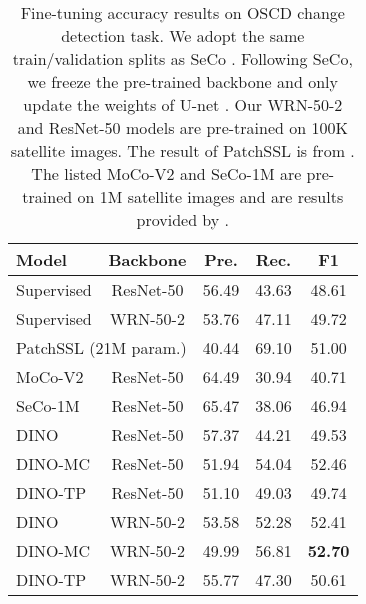 \documentclass[10pt,twocolumn,letterpaper]{article}
\begin{document}
\begin{table}
  \centering
  \begin{tabular}{lcccc}
    \toprule
    Model & Backbone & Pre. & Rec. & F1 \\
    \midrule
    Supervised & ResNet-50 & 56.49 & 43.63 & 48.61 \\
    Supervised & WRN-50-2 & 53.76 & 47.11 & 49.72 \\
    \multicolumn{2}{l}{PatchSSL (21M param.)} & 40.44 & 69.10 & 51.00 \\
MoCo-V2 & ResNet-50 & 64.49 & 30.94 & 40.71 \\
    SeCo-1M & ResNet-50 & 65.47 & 38.06 & 46.94 \\
    \midrule
    DINO & ResNet-50 & 57.37 & 44.21 & 49.53 \\
    DINO-MC & ResNet-50 & 51.94 & 54.04 & 52.46 \\
    DINO-TP & ResNet-50 & 51.10 & 49.03 & 49.74 \\
    \midrule
    DINO & WRN-50-2 & 53.58 & 52.28 & 52.41 \\
    DINO-MC & WRN-50-2 & 49.99 & 56.81 & \textbf{52.70} \\
    DINO-TP & WRN-50-2 & 55.77 & 47.30 & 50.61 \\
    \bottomrule
  \end{tabular}
  \caption{Fine-tuning accuracy results on OSCD change detection task.
  We adopt the same train/validation splits as SeCo \cite{manas2021seasonal}.
  Following SeCo, we freeze the pre-trained backbone and only update the weights of U-net \cite{ronneberger2015u}.
  Our WRN-50-2 and ResNet-50 models are pre-trained on 100K satellite images.
  The result of PatchSSL is from \cite{chen2021self}.
The listed MoCo-V2 \cite{chen2020improved} and SeCo-1M are pre-trained on 1M satellite images and are results provided by \cite{manas2021seasonal}.
  }
  \label{table:OSCD_results}
\end{table}
\end{document}
